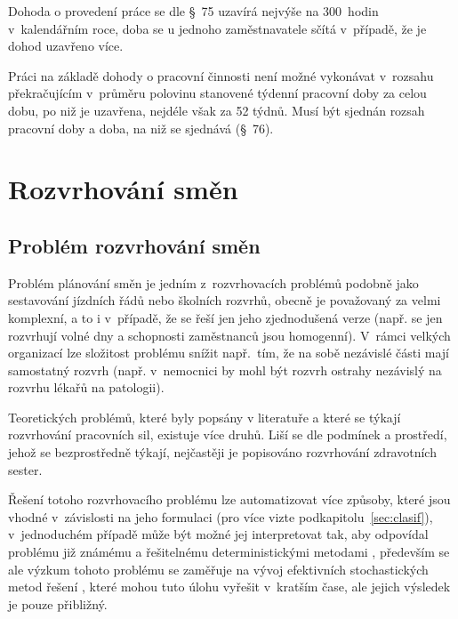 \documentclass[a4paper,11pt,openany,twoside]{book}
\begin{document}
Dohoda o provedení práce se dle §~75 uzavírá nejvýše na 300~hodin v~kalendářním roce, doba se u jednoho zaměstnavatele sčítá v~případě, že je dohod uzavřeno více.

Práci na základě dohody o pracovní činnosti není možné vykonávat v~rozsahu překračujícím v~průměru polovinu stanovené týdenní pracovní doby za celou dobu, po niž je uzavřena, nejdéle však za 52 týdnů. Musí být sjednán rozsah pracovní doby a doba, na niž se sjednává (§~76).

\chapter{Rozvrhování směn}
\section{Problém rozvrhování směn}

Problém plánování směn je jedním z~rozvrhovacích problémů podobně jako sestavování jízdních řádů nebo školních rozvrhů, obecně je považovaný za velmi komplexní, a to i v~případě, že se řeší jen jeho zjednodušená verze (např. se jen rozvrhují volné dny a schopnosti zaměstnanců jsou homogenní). V~rámci velkých organizací lze složitost problému snížit např.~tím, že na sobě nezávislé části mají samostatný rozvrh (např. v~nemocnici by mohl být rozvrh ostrahy nezávislý na rozvrhu lékařů na patologii).

Teoretických problémů, které byly popsány v literatuře a které se týkají rozvrhování pracovních sil, existuje více druhů. Liší se dle podmínek a prostředí, jehož se bezprostředně týkají, nejčastěji je popisováno rozvrhování zdravotních sester.


Řešení totoho rozvrhovacího problému lze automatizovat více způsoby, které jsou vhodné v~závislosti na jeho formulaci (pro více vizte podkapitolu~\ref{sec:clasif}), v~jednoduchém případě může být možné jej interpretovat tak, aby odpovídal problému již známému a řešitelnému deterministickými metodami \cite{blochliger2004modeling}, především se ale výzkum tohoto problému se zaměřuje na vývoj efektivních stochastických metod řešení \cite{adamuthe2012tabu}, které mohou tuto úlohu vyřešit v~kratším čase, ale jejich výsledek je pouze přibližný.
\end{document}

